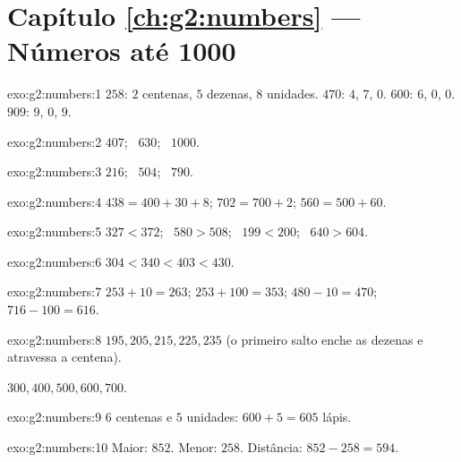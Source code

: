 \section*{Capítulo \ref{ch:g2:numbers} --- Números até 1000}

\begin{solution}{exo:g2:numbers:1}
$258$: $2$ centenas, $5$ dezenas, $8$ unidades. $470$: $4$, $7$,
$0$. $600$: $6$, $0$, $0$. $909$: $9$, $0$, $9$.
\end{solution}

\begin{solution}{exo:g2:numbers:2}
$407$; \ $630$; \ $1000$.
\end{solution}

\begin{solution}{exo:g2:numbers:3}
$216$; \ $504$; \ $790$.
\end{solution}

\begin{solution}{exo:g2:numbers:4}
$438 = 400 + 30 + 8$; \quad $702 = 700 + 2$; \quad
$560 = 500 + 60$.
\end{solution}

\begin{solution}{exo:g2:numbers:5}
$327 < 372$; \ $580 > 508$; \ $199 < 200$; \ $640 > 604$.
\end{solution}

\begin{solution}{exo:g2:numbers:6}
$304 < 340 < 403 < 430$.
\end{solution}

\begin{solution}{exo:g2:numbers:7}
$253 + 10 = 263$; \quad $253 + 100 = 353$; \quad
$480 - 10 = 470$; \quad $716 - 100 = 616$.
\end{solution}

\begin{solution}{exo:g2:numbers:8}
$195, 205, 215, 225, 235$ (o primeiro salto enche as dezenas e
atravessa a centena).

$300, 400, 500, 600, 700$.
\end{solution}

\begin{solution}{exo:g2:numbers:9}
$6$ centenas e $5$ unidades: $600 + 5 = 605$ lápis.
\end{solution}

\begin{solution}{exo:g2:numbers:10}
Maior: $852$. Menor: $258$. Distância: $852 - 258 = 594$.
\end{solution}
